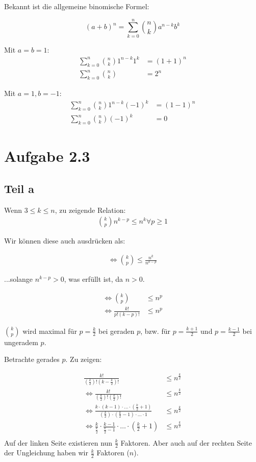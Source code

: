 \documentclass[a4paper,german,12pt,smallheadings]{scrartcl}
\begin{document}
Bekannt ist die allgemeine binomische Formel:

\begin{equation*}
  (a+b)^n = \sum_{k=0}^n {n \choose k} a^{n-k} b^k
\end{equation*}

Mit $a=b=1$:
\begin{align*}
 \sum_{k=0}^n {n \choose k} 1^{n-k} 1^k &= (1+1)^n \\
  \sum_{k=0}^n {n \choose k} &= 2^n
\end{align*}

Mit $a=1, b=-1$:
\begin{align*}
  \sum_{k=0}^n {n \choose k} 1^{n-k} (-1)^k &= (1-1)^n \\
  \sum_{k=0}^n {n \choose k} (-1)^k &= 0
\end{align*}


\section*{Aufgabe 2.3}
\subsection*{Teil a}
Wenn $3 \le k \le n$, zu zeigende Relation:
\begin{align*}
  {k \choose p} n^{k-p} \le n^k \forall p \ge 1
\end{align*}

Wir können diese auch ausdrücken als:

\begin{align*}
  \Leftrightarrow {k \choose p} \le \frac{n^k}{n^{k-p}}
\end{align*}

...solange $n^{k-p} > 0$, was erfüllt ist, da $n > 0$.

\begin{align*}
  \Leftrightarrow {k \choose p} &\le n^p \\
  \Leftrightarrow \frac{k!}{p!(k-p)!} &\le n^p
\end{align*}

$k \choose p$ wird maximal für $p=\frac{k}{2}$ bei geraden $p$, bzw. für $p=\frac{k+1}{2}$ und $p=\frac{k-1}{2}$ bei ungeradem $p$.

Betrachte gerades $p$. Zu zeigen:

\begin{align*}
  \frac{k!}{\left(\frac{k}{2}\right)! \left(k-\frac{k}{2}\right)!} &\le n^\frac{k}{2} \\
  \Leftrightarrow \frac{k!}{\left(\frac{k}{2}\right)! \left(\frac{k}{2}\right)!} &\le n^\frac{k}{2} \\
  \Leftrightarrow \frac{k \cdot (k-1) \cdot \dots \cdot \left(\frac{k}{2}+1\right)}{ \left(\frac{k}{2}\right) \cdot \left(\frac{k}{2}-1\right) \cdot \dots \cdot 1} &\le n^\frac{k}{2} \\
  \Leftrightarrow \frac{k}{\frac{k}{2}} \cdot \frac{k-1}{\frac{k}{2} - 1} \cdot \dots \cdot \left(\frac{k}{2} + 1\right) &\le n^\frac{k}{2} \\
\end{align*}
Auf der linken Seite existieren nun $\frac{k}{2}$ Faktoren. Aber auch auf der rechten Seite der Ungleichung haben wir $\frac{k}{2}$ Faktoren ($n$).
\end{document}
